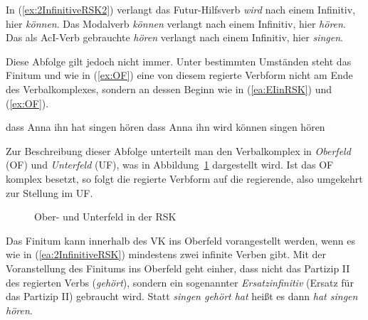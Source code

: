 In (\ref{ex:2InfinitiveRSK2}) verlangt das Futur-Hilfsverb \textit{wird} nach einem Infinitiv, hier \textit{können}. Das Modalverb \textit{können} verlangt nach einem Infinitiv, hier \textit{hören}. Das als AcI-Verb gebrauchte \textit{hören} verlangt nach einem Infinitiv, hier \textit{singen}.
 
 Diese Abfolge gilt jedoch nicht immer. Unter bestimmten Umständen steht das Finitum und wie in (\ref{ex:OF}) eine von diesem regierte Verbform nicht am Ende des Verbalkomplexes, sondern an dessen Beginn wie in (\ref{ea:EIinRSK}) und (\ref{ex:OF}). 

 \ea \label{ea:OFUF}
 \ea \label{ea:EIinRSK} dass Anna ihn hat singen hören
 \ex \label{ex:OF} dass Anna ihn wird können singen hören
 \z 
 \z 
 
 Zur Beschreibung dieser Abfolge unterteilt man den Verbalkomplex in \textit{Oberfeld} (OF) und \textit{Unterfeld} (UF), was in Abbildung~\ref{fig:OberfeldUnterfeldRSK} dargestellt wird. Ist das OF komplex besetzt, so folgt die regierte Verbform auf die regierende, also umgekehrt zur Stellung im UF.
 
 \begin{figure}[!htbp]
  \centering
  \caption{Ober- und Unterfeld in der RSK}
  \label{fig:OberfeldUnterfeldRSK}
\end{figure}

Das Finitum kann innerhalb des VK ins Oberfeld vorangestellt werden, wenn es wie in (\ref{ea:2InfinitiveRSK}) mindestens zwei infinite Verben gibt. Mit der Voranstellung des Finitums ins Oberfeld geht einher, dass nicht das Partizip II des regierten Verbs (\textit{gehört}), sondern ein sogenannter \textit{Ersatzinfinitiv} (Ersatz für das Partizip II) gebraucht wird. Statt \textit{singen gehört hat} heißt es dann \textit{hat singen hören}. 


